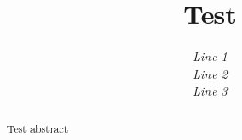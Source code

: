 \documentclass{article}
\newcommand{\IEEEauthorblockA}[1]{{\itshape #1}\\}
\begin{document}
\author{\IEEEauthorblockA{Line 1\\Line 2\\Line 3}}
\title{Test}
\maketitle
\begin{abstract}
Test abstract
\end{abstract}
\end{document}
